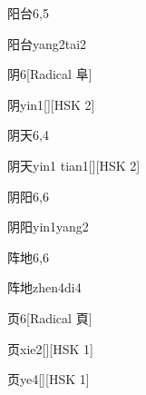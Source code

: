 \begin{entry}{阳台}{6,5}
  \begin{phonetics}{阳台}{yang2tai2}
  \end{phonetics}
\end{entry}

\begin{entry}{阴}{6}[Radical 阜]
  \begin{phonetics}{阴}{yin1}[][HSK 2]
  \end{phonetics}
\end{entry}

\begin{entry}{阴天}{6,4}
  \begin{phonetics}{阴天}{yin1 tian1}[][HSK 2]
  \end{phonetics}
\end{entry}

\begin{entry}{阴阳}{6,6}
  \begin{phonetics}{阴阳}{yin1yang2}
  \end{phonetics}
\end{entry}

\begin{entry}{阵地}{6,6}
  \begin{phonetics}{阵地}{zhen4di4}
  \end{phonetics}
\end{entry}

\begin{entry}{页}{6}[Radical 頁]
  \begin{phonetics}{页}{xie2}[][HSK 1]
  \end{phonetics}
  \begin{phonetics}{页}{ye4}[][HSK 1]
  \end{phonetics}
\end{entry}


